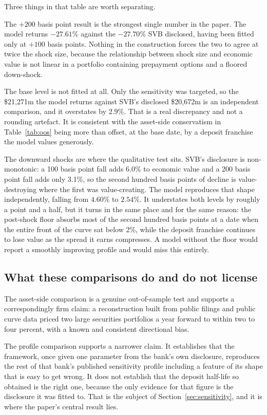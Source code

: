Three things in that table are worth separating.

The $+200$ basis point result is the strongest single number in the paper. The model
returns $-27.61\%$ against the $-27.70\%$ SVB disclosed, having been fitted only at
$+100$ basis points. Nothing in the construction forces the two to agree at twice
the shock size, because the relationship between shock size and economic value is not
linear in a portfolio containing prepayment options and a floored down-shock.

The base level is not fitted at all. Only the sensitivity was targeted, so the
\$21,271m the model returns against SVB's disclosed \$20,672m is an independent
comparison, and it overstates by 2.9\%. That is a real discrepancy and not a
rounding artefact. It is consistent with the asset-side conservatism in
Table~\ref{tab:oos} being more than offset, at the base date, by a deposit franchise
the model values generously.

The downward shocks are where the qualitative test sits. SVB's disclosure is
non-monotonic: a 100 basis point fall adds 6.0\% to economic value and a 200 basis
point fall adds only 3.1\%, so the second hundred basis points of decline is
value-destroying where the first was value-creating. The model reproduces that shape
independently, falling from $4.60\%$ to $2.54\%$. It understates both levels by
roughly a point and a half, but it turns in the same place and for the same reason:
the post-shock floor absorbs most of the second hundred basis points at a date when
the entire front of the curve sat below 2\%, while the deposit franchise continues to
lose value as the spread it earns compresses. A model without the floor would report
a smoothly improving profile and would miss this entirely.

\subsection{What these comparisons do and do not license}

The asset-side comparison is a genuine out-of-sample test and supports a
correspondingly firm claim: a reconstruction built from public filings and public
curve data priced two large securities portfolios a year forward to within two to
four percent, with a known and consistent directional bias.

The profile comparison supports a narrower claim. It establishes that the framework,
once given one parameter from the bank's own disclosure, reproduces the rest of that
bank's published sensitivity profile including a feature of its shape that is easy to
get wrong. It does not establish that the deposit half-life so obtained is the right
one, because the only evidence for that figure is the disclosure it was fitted to.
That is the subject of Section~\ref{sec:sensitivity}, and it is where the paper's
central result lies.
